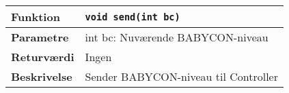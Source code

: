 \begin{center}
    \begin{tabular}{ | l | p{} |}
    \hline
    \textbf{Funktion}	& \verb+void send(int bc) +						\\ \hline
    \textbf{Parametre} 	& int bc: Nuværende BABYCON-niveau			\\ \hline
    \textbf{Returværdi}	& Ingen	 								\\ \hline
    \textbf{Beskrivelse}& Sender BABYCON-niveau til Controller		\\ \hline
    \end{tabular}
\end{center}


